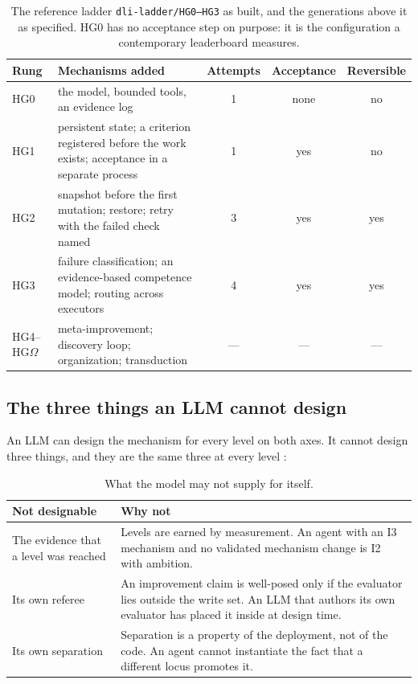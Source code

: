 \documentclass[11pt]{article}
\theoremstyle{definition}
\newcommand{\Om}{\ensuremath{\Omega}}
\begin{document}
\begin{table}[H]
\centering\small
\begin{tabularx}{\textwidth}{@{}lYccc@{}}
\toprule
Rung & Mechanisms added & Attempts & Acceptance & Reversible \\
\midrule
HG0 & the model, bounded tools, an evidence log & 1 & none & no \\
HG1 & persistent state; a criterion registered before the work exists; acceptance in a separate process & 1 & yes & no \\
HG2 & snapshot before the first mutation; restore; retry with the failed check named & 3 & yes & yes \\
HG3 & failure classification; an evidence-based competence model; routing across executors & 4 & yes & yes \\
HG4--HG\Om{} & meta-improvement; discovery loop; organization; transduction & --- & --- & --- \\
\bottomrule
\end{tabularx}
\caption{The reference ladder \texttt{dli-ladder/HG0--HG3} as built, and the generations above it as specified. HG0 has no acceptance step on purpose: it is the configuration a contemporary leaderboard measures.}
\label{tab:ladder}
\end{table}

\subsection{The three things an LLM cannot design}\label{sec:three}

An LLM can design the mechanism for every level on both axes. It cannot design three things, and they are the same three at every level \citep{yang2026designing}:

\begin{table}[H]
\centering\small
\begin{tabularx}{\textwidth}{@{}lY@{}}
\toprule
Not designable & Why not \\
\midrule
The evidence that a level was reached & Levels are earned by measurement. An agent with an I3 mechanism and no validated mechanism change is I2 with ambition. \\
Its own referee & An improvement claim is well-posed only if the evaluator lies outside the write set. An LLM that authors its own evaluator has placed it inside at design time. \\
Its own separation & Separation is a property of the deployment, not of the code. An agent cannot instantiate the fact that a different locus promotes it. \\
\bottomrule
\end{tabularx}
\caption{What the model may not supply for itself.}
\label{tab:three}
\end{table}
\end{document}
